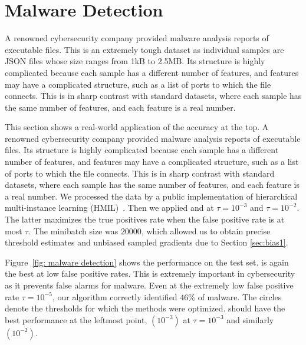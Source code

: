 \section{Malware Detection}

A renowned cybersecurity company provided malware analysis reports of executable files. This is an extremely tough dataset as individual samples are JSON files whose size ranges from 1kB to 2.5MB. Its structure is highly complicated because each sample has a different number of features, and features may have a complicated structure, such as a list of ports to which the file connects. This is in sharp contrast with standard datasets, where each sample has the same number of features, and each feature is a real number.

This section shows a real-world application of the accuracy at the top. A renowned cybersecurity company provided malware analysis reports of executable files. Its structure is highly complicated because each sample has a different number of features, and features may have a complicated structure, such as a list of ports to which the file connects. This is in sharp contrast with standard datasets, where each sample has the same number of features, and each feature is a real number. We processed the data by a public implementation of hierarchical multi-instance learning (HMIL)~\cite{pevny2017using}. Then we applied \DeepTopPush and \PatMatNP at $\tau=10^{-3}$ and $\tau=10^{-2}$. The latter maximizes the true positives rate when the false positive rate is at most $\tau$. The minibatch size was $20000$, which allowed us to obtain precise threshold estimates and unbiased sampled gradients due to Section \ref{sec:bias1}.

Figure~\ref{fig: malware detection} shows the performance on the test set. \DeepTopPush is again the best at low false positive rates. This is extremely important in cybersecurity as it prevents false alarms for malware. Even at the extremely low false positive rate $\tau=10^{-5}$, our algorithm correctly identified $46\%$ of malware. The circles denote the thresholds for which the methods were optimized. \DeepTopPush should have the best performance at the leftmost point, \PatMatNP$\left(10^{-3}\right)$ at $\tau=10^{-3}$ and similarly \PatMatNP$\left(10^{-2}\right)$.

